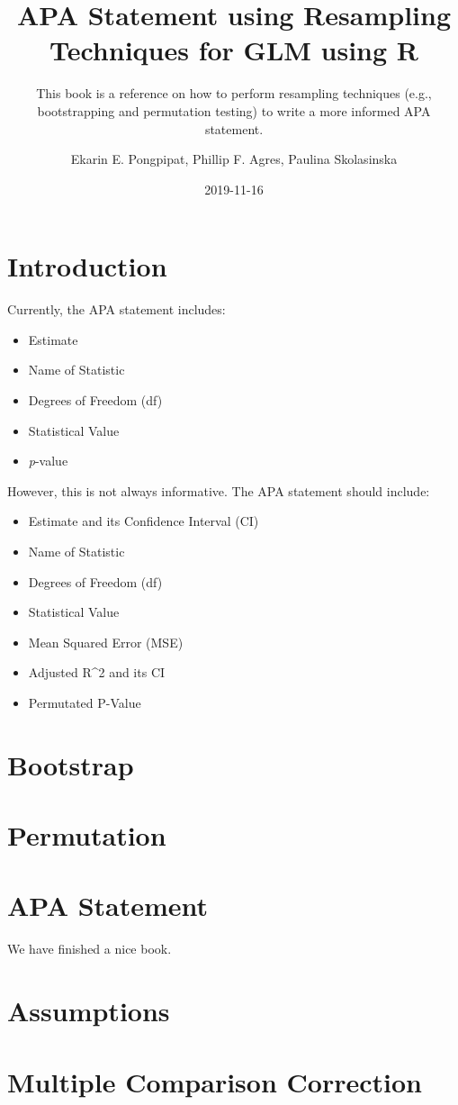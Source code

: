 \documentclass[]{book}
\title{APA Statement using Resampling Techniques for GLM using R}
\subtitle{This book is a reference on how to perform resampling techniques (e.g., bootstrapping and permutation testing) to write a more informed APA statement.}
\author{Ekarin E. Pongpipat, Phillip F. Agres, Paulina Skolasinska}
\date{2019-11-16}
\providecommand{\tightlist}{%
  \setlength{\itemsep}{0pt}\setlength{\parskip}{0pt}}
\begin{document}
\maketitle

{
\setcounter{tocdepth}{1}
\tableofcontents
}
\hypertarget{introduction}{%
\chapter{Introduction}\label{introduction}}

Currently, the APA statement includes:

\begin{itemize}
\tightlist
\item
  Estimate
\item
  Name of Statistic
\item
  Degrees of Freedom (df)
\item
  Statistical Value
\item
  \emph{p}-value
\end{itemize}

However, this is not always informative. The APA statement should include:

\begin{itemize}
\tightlist
\item
  Estimate and its Confidence Interval (CI)
\item
  Name of Statistic
\item
  Degrees of Freedom (df)
\item
  Statistical Value
\item
  Mean Squared Error (MSE)
\item
  Adjusted R\^{}2 and its CI
\item
  Permutated P-Value
\end{itemize}

\hypertarget{bootstrap}{%
\chapter{Bootstrap}\label{bootstrap}}

\hypertarget{permutation}{%
\chapter{Permutation}\label{permutation}}

\hypertarget{apa-statement}{%
\chapter{APA Statement}\label{apa-statement}}

We have finished a nice book.

\hypertarget{assumptions}{%
\chapter{Assumptions}\label{assumptions}}

\hypertarget{multiple-comparison-correction}{%
\chapter{Multiple Comparison Correction}\label{multiple-comparison-correction}}


\end{document}
